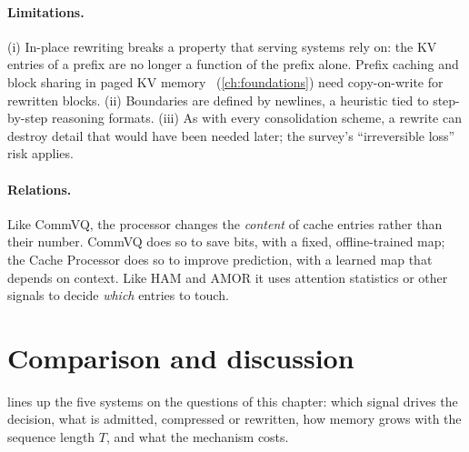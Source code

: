 \paragraph{Limitations.} (i) In-place rewriting breaks a property that serving systems rely on: the KV
entries of a prefix are no longer a function of the prefix alone. Prefix caching and block sharing in
paged KV memory~\citep{kwon2023paged} (\cref{ch:foundations}) need copy-on-write for rewritten blocks.
(ii) Boundaries are defined by newlines, a heuristic tied to step-by-step reasoning formats. (iii) As
with every consolidation scheme, a rewrite can destroy detail that would have been needed later; the
survey's ``irreversible loss'' risk applies.

\paragraph{Relations.} Like CommVQ, the processor changes the \emph{content} of cache entries rather
than their number. CommVQ does so to save bits, with a fixed, offline-trained map; the Cache Processor
does so to improve prediction, with a learned map that depends on context. Like HAM and AMOR it uses
attention statistics or other signals to decide \emph{which} entries to touch.

\section{Comparison and discussion}\label{sec:c13-compare}

 lines up the five systems on the questions of this chapter: which signal
drives the decision, what is admitted, compressed or rewritten, how memory grows with the sequence length
$T$, and what the mechanism costs.

